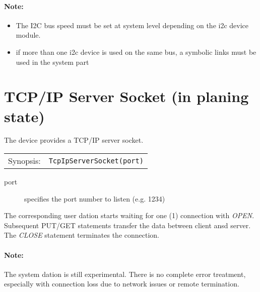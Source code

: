 \paragraph{Note:}
\begin{itemize}
\item The I2C bus speed must be set at system level depending on the 
i2c device module.
\item if more than one i2c device is used on the same bus, a symbolic
   links must be used in the system part
\end{itemize}


\section{TCP/IP Server Socket (in planing state)}
The device provides a TCP/IP server socket.

\begin{tabular}{ll}
Synopsis: & \verb|TcpIpServerSocket(port)|\\ 
\end{tabular}

\begin{description}
\item[port] specifies the port number to listen (e.g. 1234)
\end{description}

The corresponding user dation starts waiting for one (1) connection with {\em OPEN}.
Subsequent PUT/GET statements transfer the data between client ansd server.
The {\em CLOSE} statement terminates the connection.

\paragraph{Note:} The system dation is still experimental. 
There is no complete error treatment, especially with connection loss due 
to network issues or remote termination.


